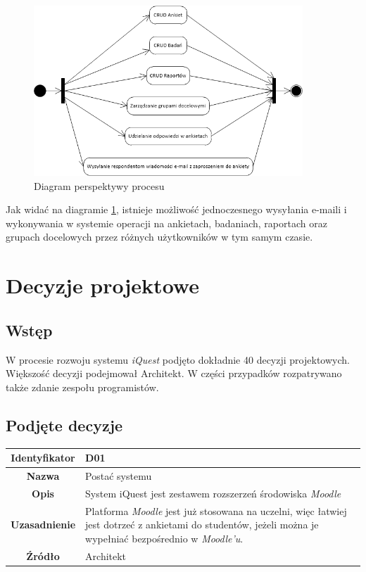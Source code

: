 \begin{figure}[H]
\centering\includegraphics[width=0.9\textwidth]{figures/ProcessView}
\caption{Diagram perspektywy procesu}\label{rys:PerspektywaProcesu}
\end{figure}

Jak widać na diagramie \ref{rys:PerspektywaProcesu}, istnieje możliwość jednoczesnego wysyłania e-maili i wykonywania w systemie operacji na ankietach, badaniach, raportach oraz grupach docelowych przez różnych użytkowników w tym samym czasie.

\section{Decyzje projektowe}
\label{Chapter55}

\subsection{Wstęp}
\label{Chapter551}

W procesie rozwoju systemu \textit{iQuest} podjęto dokładnie 40 decyzji projektowych. Większość decyzji podejmował Architekt. W części przypadków rozpatrywano także zdanie zespołu programistów.

\subsection{Podjęte decyzje}
\label{Chapter552}

\begin{table}[H]
\centering
\begin{tabular}{ | >{\bfseries}c | p{11cm} | }
\hline
%
Identyfikator & D01 \\ \hline
Nazwa & Postać systemu \\ \hline
Opis & System iQuest jest zestawem rozszerzeń środowiska \textit{Moodle} \\ \hline
Uzasadnienie & Platforma \textit{Moodle} jest już stosowana na uczelni, więc łatwiej jest dotrzeć z ankietami do studentów, jeżeli można je wypełniać bezpośrednio w \textit{Moodle'u}. \\ \hline
Źródło & Architekt \\ \hline
%
\end{tabular}
\end{table}

